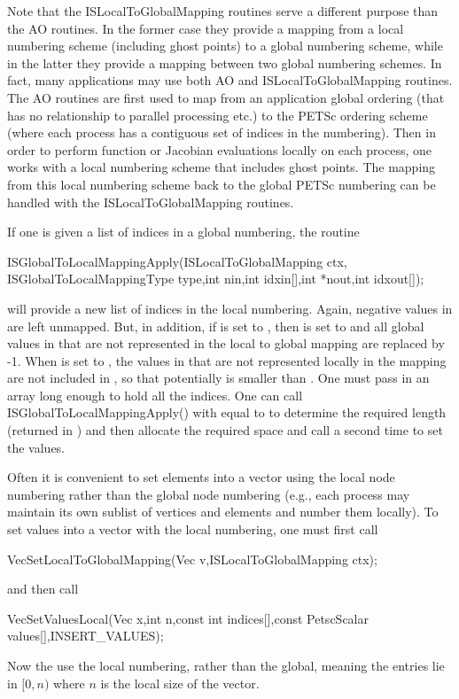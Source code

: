 Note that the ISLocalToGlobalMapping routines serve a different purpose
than the AO  routines. In the former case they provide a mapping 
from  a local numbering scheme (including ghost points) to a global numbering scheme,
while in the latter they provide a mapping between two global numbering schemes.
In fact, many applications may use both AO and ISLocalToGlobalMapping routines.
The AO routines are first used to map from an application global ordering 
(that has no relationship to parallel processing etc.) to the PETSc ordering scheme
(where each process has a contiguous set of indices in the numbering). Then in order
to perform function or Jacobian evaluations locally on each process, one works
with a local numbering scheme that includes ghost points.  The mapping from this local
numbering scheme back to the global PETSc numbering can be handled with the 
ISLocalToGlobalMapping routines.

If one is given a list of indices in a global numbering, the routine
\begin{tabbing}
  ISGlobalToLocalMappingApply(ISLocalToGlobalMapping ctx,\\
                              ISGlobalToLocalMappingType type,int nin,int idxin[],int *nout,int idxout[]);
\end{tabbing}
   will provide
a new list of indices in the local numbering. Again, negative values in 
 are left unmapped.  But, in addition, if  is set to 
, 
then  is set to  and all global values
in  that are not represented in the local to global mapping
are replaced by -1. When  is set to ,
 the values in  that are not
represented locally in the mapping are not included in , so that
potentially  is smaller than .  One must
pass in an array long enough to hold all the indices. One can call
ISGlobalToLocalMappingApply() with  equal to 
 to determine the required length (returned in 
) and then allocate the required space and call 
 a second time to set the values.

Often it is convenient to set elements into a vector using the local node 
numbering rather than the global node numbering (e.g.,  each process may
maintain its own sublist of vertices and elements and number them locally).
To set values into a vector with the local numbering, one must first call
\begin{tabbing}
  VecSetLocalToGlobalMapping(Vec v,ISLocalToGlobalMapping ctx);
\end{tabbing}
 
and then call 
\begin{tabbing}
  VecSetValuesLocal(Vec x,int n,const int indices[],const PetscScalar values[],INSERT\_VALUES);
\end{tabbing}
Now the  use the local numbering, rather than the global, meaning
the entries lie in $[0,n)$ where $n$ is the local size of the vector.

